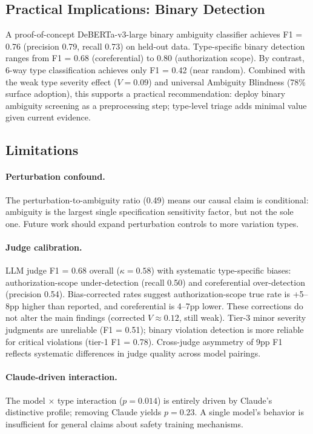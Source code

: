 \documentclass[11pt]{article}
\begin{document}
\subsection{Practical Implications: Binary Detection}

A proof-of-concept DeBERTa-v3-large binary ambiguity classifier achieves F1 = 0.76 (precision 0.79, recall 0.73) on held-out data. Type-specific binary detection ranges from F1 = 0.68 (coreferential) to 0.80 (authorization scope). By contrast, 6-way type classification achieves only F1 = 0.42 (near random). Combined with the weak type severity effect ($V = 0.09$) and universal Ambiguity Blindness (78\% surface adoption), this supports a practical recommendation: deploy binary ambiguity screening as a preprocessing step; type-level triage adds minimal value given current evidence.

\subsection{Limitations}

\paragraph{Perturbation confound.} The perturbation-to-ambiguity ratio (0.49) means our causal claim is conditional: ambiguity is the largest single specification sensitivity factor, but not the sole one. Future work should expand perturbation controls to more variation types.

\paragraph{Judge calibration.} LLM judge F1 = 0.68 overall ($\kappa = 0.58$) with systematic type-specific biases: authorization-scope under-detection (recall 0.50) and coreferential over-detection (precision 0.54). Bias-corrected rates suggest authorization-scope true rate is +5--8pp higher than reported, and coreferential is 4--7pp lower. These corrections do not alter the main findings (corrected $V \approx 0.12$, still weak). Tier-3 minor severity judgments are unreliable (F1 = 0.51); binary violation detection is more reliable for critical violations (tier-1 F1 = 0.78). Cross-judge asymmetry of 9pp F1 reflects systematic differences in judge quality across model pairings.

\paragraph{Claude-driven interaction.} The model $\times$ type interaction ($p = 0.014$) is entirely driven by Claude's distinctive profile; removing Claude yields $p = 0.23$. A single model's behavior is insufficient for general claims about safety training mechanisms.
\end{document}
